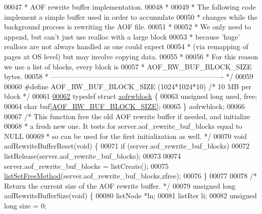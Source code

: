 \begin{DoxyCode}
00047 \textcolor{comment}{ * AOF rewrite buffer implementation.}
00048 \textcolor{comment}{ *}
00049 \textcolor{comment}{ * The following code implement a simple buffer used in order to accumulate}
00050 \textcolor{comment}{ * changes while the background process is rewriting the AOF file.}
00051 \textcolor{comment}{ *}
00052 \textcolor{comment}{ * We only need to append, but can't just use realloc with a large block}
00053 \textcolor{comment}{ * because 'huge' reallocs are not always handled as one could expect}
00054 \textcolor{comment}{ * (via remapping of pages at OS level) but may involve copying data.}
00055 \textcolor{comment}{ *}
00056 \textcolor{comment}{ * For this reason we use a list of blocks, every block is}
00057 \textcolor{comment}{ * AOF\_RW\_BUF\_BLOCK\_SIZE bytes.}
00058 \textcolor{comment}{ * ------------------------------------------------------------------------- */}
00059 
00060 \textcolor{preprocessor}{#}\textcolor{preprocessor}{define} \textcolor{preprocessor}{AOF\_RW\_BUF\_BLOCK\_SIZE} \textcolor{preprocessor}{(}1024\textcolor{preprocessor}{*}1024\textcolor{preprocessor}{*}10\textcolor{preprocessor}{)}    \textcolor{comment}{/* 10 MB per block */}
00061 
\hyperlink{structaofrwblock}{00062} \textcolor{keyword}{typedef} \textcolor{keyword}{struct} \hyperlink{structaofrwblock}{aofrwblock} \{
00063     \textcolor{keywordtype}{unsigned} \textcolor{keywordtype}{long} used, free;
00064     \textcolor{keywordtype}{char} buf[\hyperlink{aof_8c_a44139ff5d81f229e77d843b17ada505e}{AOF\_RW\_BUF\_BLOCK\_SIZE}];
00065 \} aofrwblock;
00066 
00067 \textcolor{comment}{/* This function free the old AOF rewrite buffer if needed, and initialize}
00068 \textcolor{comment}{ * a fresh new one. It tests for server.aof\_rewrite\_buf\_blocks equal to NULL}
00069 \textcolor{comment}{ * so can be used for the first initialization as well. */}
00070 \textcolor{keywordtype}{void} aofRewriteBufferReset(\textcolor{keywordtype}{void}) \{
00071     \textcolor{keywordflow}{if} (server.aof\_rewrite\_buf\_blocks)
00072         listRelease(server.aof\_rewrite\_buf\_blocks);
00073 
00074     server.aof\_rewrite\_buf\_blocks = listCreate();
00075     \hyperlink{adlist_8h_a648e4a2d20decff3182a72a608b0b8f2}{listSetFreeMethod}(server.aof\_rewrite\_buf\_blocks,zfree);
00076 \}
00077 
00078 \textcolor{comment}{/* Return the current size of the AOF rewrite buffer. */}
00079 \textcolor{keywordtype}{unsigned} \textcolor{keywordtype}{long} aofRewriteBufferSize(\textcolor{keywordtype}{void}) \{
00080     listNode *ln;
00081     listIter li;
00082     \textcolor{keywordtype}{unsigned} \textcolor{keywordtype}{long} size = 0;

\end{DoxyCode}
